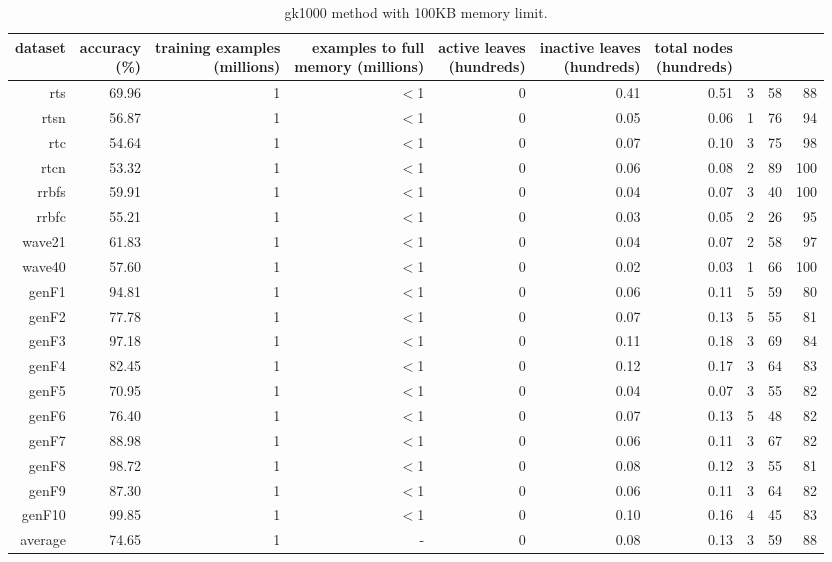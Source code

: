 \clearpage
\begin{table}
\caption{{\sc gk1000} method with 100KB memory limit.}
\label{tab:gk1000-100k}
\centering
\begin{tabular}{|r|r|r|r|r|r|r|r|r|r|}
\hline
dataset	&
\rotatebox{90}{\parbox{9em}{accuracy\\(\%)}} &
\rotatebox{90}{\parbox{9em}{training examples\\(millions)}} &
\rotatebox{90}{\parbox{9em}{examples to full\\memory (millions)}} &
\rotatebox{90}{\parbox{9em}{active leaves\\(hundreds)}} &
\rotatebox{90}{\parbox{9em}{inactive leaves\\(hundreds)}} &
\rotatebox{90}{\parbox{9em}{total nodes\\(hundreds)}} &
\rotatebox{90}{\parbox{9em}{tree depth}}	&
\rotatebox{90}{\parbox{9em}{training speed (\%)}} &
\rotatebox{90}{\parbox{9em}{prediction speed (\%)}} \\
\hline
{\sc rts} & 69.96 & 1 & $<$1 & 0 & 0.41 & 0.51 & 3 & 58 & 88 \\
{\sc rtsn} & 56.87 & 1 & $<$1 & 0 & 0.05 & 0.06 & 1 & 76 & 94 \\
{\sc rtc} & 54.64 & 1 & $<$1 & 0 & 0.07 & 0.10 & 3 & 75 & 98 \\
{\sc rtcn} & 53.32 & 1 & $<$1 & 0 & 0.06 & 0.08 & 2 & 89 & 100 \\
{\sc rrbfs} & 59.91 & 1 & $<$1 & 0 & 0.04 & 0.07 & 3 & 40 & 100 \\
{\sc rrbfc} & 55.21 & 1 & $<$1 & 0 & 0.03 & 0.05 & 2 & 26 & 95 \\
{\sc wave21} & 61.83 & 1 & $<$1 & 0 & 0.04 & 0.07 & 2 & 58 & 97 \\
{\sc wave40} & 57.60 & 1 & $<$1 & 0 & 0.02 & 0.03 & 1 & 66 & 100 \\
{\sc genF1} & 94.81 & 1 & $<$1 & 0 & 0.06 & 0.11 & 5 & 59 & 80 \\
{\sc genF2} & 77.78 & 1 & $<$1 & 0 & 0.07 & 0.13 & 5 & 55 & 81 \\
{\sc genF3} & 97.18 & 1 & $<$1 & 0 & 0.11 & 0.18 & 3 & 69 & 84 \\
{\sc genF4} & 82.45 & 1 & $<$1 & 0 & 0.12 & 0.17 & 3 & 64 & 83 \\
{\sc genF5} & 70.95 & 1 & $<$1 & 0 & 0.04 & 0.07 & 3 & 55 & 82 \\
{\sc genF6} & 76.40 & 1 & $<$1 & 0 & 0.07 & 0.13 & 5 & 48 & 82 \\
{\sc genF7} & 88.98 & 1 & $<$1 & 0 & 0.06 & 0.11 & 3 & 67 & 82 \\
{\sc genF8} & 98.72 & 1 & $<$1 & 0 & 0.08 & 0.12 & 3 & 55 & 81 \\
{\sc genF9} & 87.30 & 1 & $<$1 & 0 & 0.06 & 0.11 & 3 & 64 & 82 \\
{\sc genF10} & 99.85 & 1 & $<$1 & 0 & 0.10 & 0.16 & 4 & 45 & 83 \\
\hline
average & 74.65 & 1 &  -  & 0 & 0.08 & 0.13 & 3 & 59 & 88 \\
\hline
\end{tabular}
\end{table}
